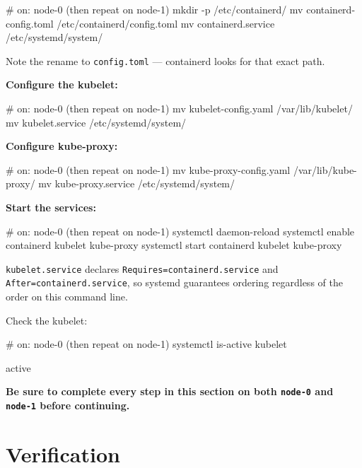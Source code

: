 \documentclass[11pt,oneside]{report}
\begin{document}
\begin{cmdlst}
# on: node-0 (then repeat on node-1)
{
  mkdir -p /etc/containerd/
  mv containerd-config.toml /etc/containerd/config.toml
  mv containerd.service /etc/systemd/system/
}
\end{cmdlst}

Note the rename to
\texttt{config.toml}
--- containerd looks
for that exact path.

\textbf{Configure
the kubelet:}

\begin{cmdlst}
# on: node-0 (then repeat on node-1)
{
  mv kubelet-config.yaml /var/lib/kubelet/
  mv kubelet.service /etc/systemd/system/
}
\end{cmdlst}

\textbf{Configure
kube-proxy:}

\begin{cmdlst}
# on: node-0 (then repeat on node-1)
{
  mv kube-proxy-config.yaml /var/lib/kube-proxy/
  mv kube-proxy.service /etc/systemd/system/
}
\end{cmdlst}

\textbf{Start the
services:}

\begin{cmdlst}
# on: node-0 (then repeat on node-1)
{
  systemctl daemon-reload
  systemctl enable containerd kubelet kube-proxy
  systemctl start containerd kubelet kube-proxy
}
\end{cmdlst}

\texttt{kubelet.service}
declares
\texttt{Requires=containerd.}\allowbreak{}\texttt{service}
and
\texttt{After=containerd.}\allowbreak{}\texttt{service},
so systemd
guarantees ordering
regardless of the
order on this
command line.

Check the kubelet:

\begin{cmdlst}
# on: node-0 (then repeat on node-1)
systemctl is-active kubelet
\end{cmdlst}

\begin{outlst}
active
\end{outlst}

\textbf{Be sure to
complete every step
in this section on
both \texttt{node-0}
and \texttt{node-1}
before continuing.}

\hypertarget{verification-8}{%
\section{Verification}\label{verification-8}}
\end{document}
